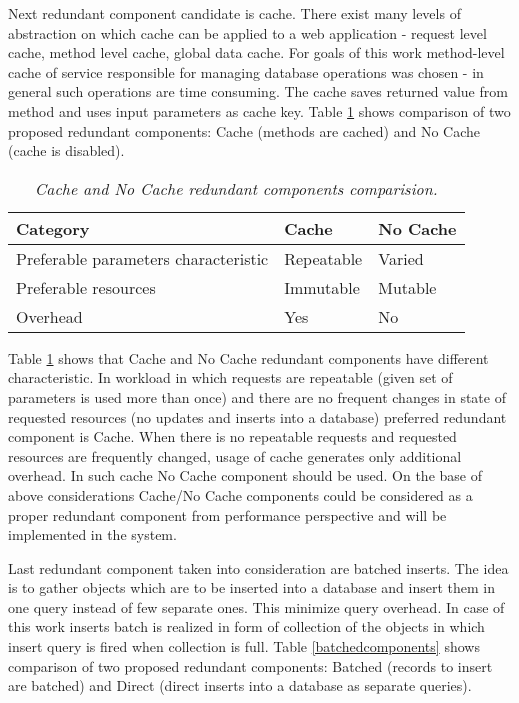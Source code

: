 \documentclass[10pt,a4paper]{article}
\begin{document}
Next redundant component candidate is cache. There exist many levels of abstraction on which cache can be applied to a web application - request level cache, method level cache, global data cache. For goals of this work method-level cache of service responsible for managing database operations was chosen - in general such operations are time consuming. The cache saves returned value from method and uses input parameters as cache key. Table \ref{cachecomponents} shows comparison of two proposed redundant components: Cache (methods are cached) and No Cache (cache is disabled).
\begin{table}[!htb]
\def\arraystretch{1.5}
\caption{\textit{Cache and No Cache redundant components comparision.}}\label{cachecomponents}
\begin{tabularx}{\textwidth}{p{3cm}|X|X}
  \textbf{Category} &\textbf{Cache} & \textbf{No Cache} \\
\hline
Preferable parameters characteristic & Repeatable & Varied \\
Preferable resources & Immutable & Mutable\\
Overhead & Yes & No\\
\end{tabularx}
\end{table}
 
Table \ref{cachecomponents} shows that Cache and No Cache redundant components have different characteristic. In workload in which requests are repeatable (given set of parameters is used more than once) and there are no frequent changes in state of requested resources (no updates and inserts into a database) preferred redundant component is Cache. When there is no repeatable requests and requested resources are frequently changed, usage of cache generates only additional overhead. In such cache No Cache component should be used. On the base of above considerations Cache/No Cache components could be considered as a proper redundant component from performance perspective and will be implemented in the system. 

Last redundant component taken into consideration are batched inserts. The idea is to gather objects which are to be inserted into a database and insert them in one query instead of few separate ones. This minimize query overhead. In case of this work inserts batch is realized in form of collection of the objects in which insert query is fired when collection is full.   
Table \ref{batchedcomponents} shows comparison of two proposed redundant components: Batched (records to insert are batched) and Direct (direct inserts into a database as separate queries).
\end{document}
